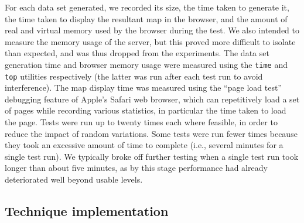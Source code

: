\documentclass[acmnow]{acmtrans2m}
\begin{document}
For each data set generated, we recorded its size, the time taken to
generate it, the time taken to display the resultant map in the browser,
and the amount of real and virtual memory used by the browser during the
test. We also intended to measure the memory usage of the server, but
this proved more difficult to isolate than expected, and was thus
dropped from the experiments. The data set generation time and browser
memory usage were measured using the \texttt{time} and \texttt{top}
utilities respectively (the latter was run after each test run to avoid
interference). The map display time was measured using the ``page load
test'' debugging feature of Apple's Safari web browser, which can
repetitively load a set of pages while recording various statistics, in
particular the time taken to load the page. Tests were run up to twenty
times each where feasible, in order to reduce the impact of random
variations. Some tests were run fewer times because they took an
excessive amount of time to complete (i.e., several minutes for a single
test run). We typically broke off further testing when a single test run
took longer than about five minutes, as by this stage performance had
already deteriorated well beyond usable levels.


\subsection{Technique implementation}
\end{document}

